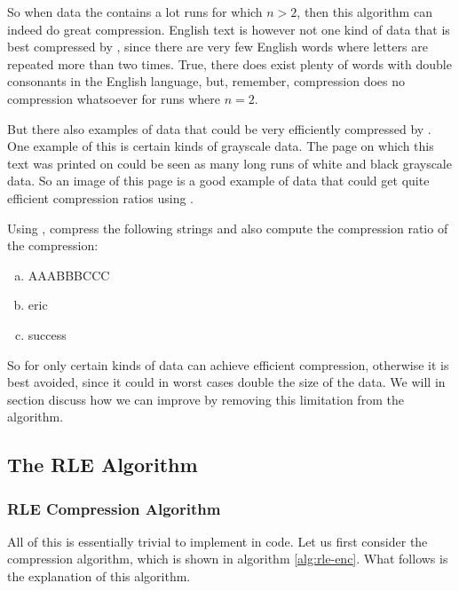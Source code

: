 So when data the contains a lot runs for which $n > 2$, then this
algorithm can indeed do great compression. English text is however not
one kind of data that is best compressed by \rle, since there are very
few English words where letters are repeated more than two
times. True, there does exist plenty of words with double consonants
in the English language, but, remember, \rle compression does no
compression whatsoever for runs where $n=2$.

But there also examples of data that could be very efficiently
compressed by \rle. One example of this is certain kinds of grayscale
data. The page on which this text was printed on could be seen as many
long runs of white and black grayscale data. So an image of this page
is a good example of data that could get quite efficient compression
ratios using \rle.

\begin{Exercise}[label={rle-compression}]
  Using \rle, compress the following strings and also compute the
  compression ratio of the compression:

  \begin{enumerate}[(a)]
  \item AAABBBCCC
  \item eric
  \item success
  \end{enumerate}

\end{Exercise}

So for only certain kinds of data can \rle achieve efficient
compression, otherwise it is best avoided, since it could in worst
cases double the size of the data. We will in section  discuss how we
can improve \rle by removing this limitation from the algorithm.

\subsection{The RLE Algorithm}

\subsubsection{RLE Compression Algorithm}

All of this is essentially trivial to implement in code. Let us first
consider the compression algorithm, which is shown in algorithm
\ref{alg:rle-enc}. What follows is the explanation of this algorithm.

